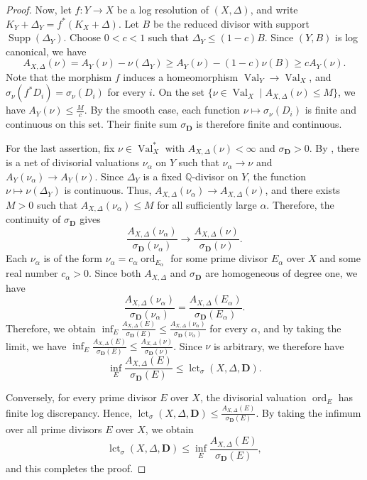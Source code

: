 \documentclass[a4paper,12pt]{amsart}
\theoremstyle{plain}
\theoremstyle{definition}
\numberwithin{equation}{section}
\newcommand{\Q}{\mathbb{Q}}
\DeclareMathOperator{\ord}{ord}
\DeclareMathOperator{\Val}{Val}
\def\Supp{\operatorname{Supp}}
\def\lct{\operatorname{lct}}
\begin{document}
\begin{proof}
    Now, let $f\colon Y\to X$ be a log resolution of $(X,\Delta)$, and write $K_Y+\Delta_Y=f^{\ast}(K_X+\Delta)$. Let $B$ be the reduced divisor with support $\Supp(\Delta_Y)$. Choose $0<c<1$ such that $\Delta_Y\leq (1-c)B$. Since $(Y,B)$ is log canonical, we have
    \[
    A_{X,\Delta}(\nu)=A_Y(\nu)-\nu(\Delta_Y)\geq A_Y(\nu)-(1-c)\nu(B)\geq cA_Y(\nu).
    \]
    Note that the morphism $f$ induces a homeomorphism $\Val_Y\to \Val_X$, and $\sigma_{\nu}(f^{\ast}D_i)=\sigma_{\nu}(D_i)$ for every $i$. On the set $\{\nu\in \Val_X\mid A_{X,\Delta}(\nu)\leq M\}$, we have $A_Y(\nu)\leq \frac{M}{c}$. By the smooth case, each function $\nu\mapsto \sigma_{\nu}(D_i)$ is finite and continuous on this set. Their finite sum $\sigma_{\mathbf{D}}$ is therefore finite and continuous.

    For the last assertion, fix $\nu\in \Val_X^{\ast}$ with $A_{X,\Delta}(\nu)<\infty$ and $\sigma_{\mathbf{D}}>0$. By \cite[Lemma 2.3]{Leh}, there is a net of divisorial valuations $\nu_{\alpha}$ on $Y$ such that $\nu_{\alpha}\to \nu$ and $A_Y(\nu_{\alpha})\to A_Y(\nu)$. Since $\Delta_Y$ is a fixed $\Q$-divisor on $Y$, the function $\nu\mapsto \nu(\Delta_Y)$ is continuous. Thus, $A_{X,\Delta}(\nu_{\alpha})\to A_{X,\Delta}(\nu)$, and there exists $M>0$ such that $A_{X,\Delta}(\nu_{\alpha})\leq M$ for all sufficiently large $\alpha$. Therefore, the continuity of $\sigma_{\mathbf{D}}$ gives
    \[
    \frac{A_{X,\Delta}(\nu_{\alpha})}{\sigma_{\mathbf{D}}(\nu_{\alpha})}\longrightarrow \frac{A_{X,\Delta}(\nu)}{\sigma_{\mathbf{D}}(\nu)}.
    \]
    Each $\nu_{\alpha}$ is of the form $\nu_{\alpha}=c_{\alpha}\ord_{E_{\alpha}}$ for some prime divisor $E_{\alpha}$ over $X$ and some real number $c_{\alpha}>0$. Since both $A_{X,\Delta}$ and $\sigma_{\mathbf{D}}$ are homogeneous of degree one, we have
    \[ 
    \frac{A_{X,\Delta}(\nu_\alpha)}{\sigma_{\mathbf D}(\nu_\alpha)}=\frac{A_{X,\Delta}(E_\alpha)}{\sigma_{\mathbf D}(E_\alpha)}.
    \]
    Therefore, we obtain $\inf_E\frac{A_{X,\Delta}(E)}{\sigma_{\mathbf D}(E)}\leq \frac{A_{X,\Delta}(\nu_\alpha)}{\sigma_{\mathbf D}(\nu_\alpha)}$ for every $\alpha$, and by taking the limit, we have $\inf_E\frac{A_{X,\Delta}(E)}{\sigma_{\mathbf D}(E)}\leq \frac{A_{X,\Delta}(\nu)}{\sigma_{\mathbf D}(\nu)}$.
    Since $\nu$ is arbitrary, we therefore have 
    \[
    \inf_E \frac{A_{X,\Delta}(E)}{\sigma_{\mathbf{D}}(E)}\leq \lct_{\sigma}(X,\Delta,\mathbf{D}).
    \]

    Conversely, for every prime divisor $E$ over $X$, the divisorial valuation $\ord_E$ has finite log discrepancy. Hence, $\lct_{\sigma}(X,\Delta,\mathbf{D})\leq \frac{A_{X,\Delta}(E)}{\sigma_{\mathbf{D}}(E)}$. By taking the infimum over all prime divisors $E$ over $X$, we obtain
    \[
    \lct_{\sigma}(X,\Delta,\mathbf{D})\leq \inf_E \frac{A_{X,\Delta}(E)}{\sigma_{\mathbf{D}}(E)},
    \]
    and this completes the proof.
\end{proof}
\end{document}
